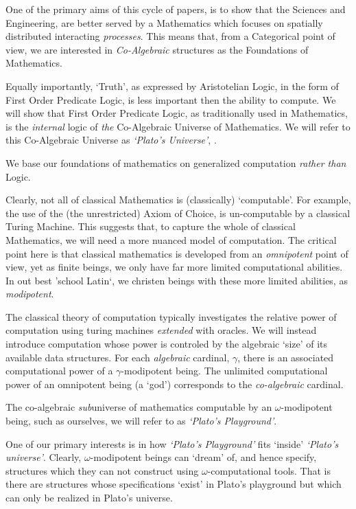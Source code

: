 \documentclass[a4paper,openany]{amsbook}
\begin{document}
One of the primary aims of this cycle of papers, is to show that the Sciences
and Engineering, are better served by a Mathematics which focuses on spatially
distributed interacting \emph{processes}. This means that, from a Categorical
point of view, we are interested in \emph{Co-Algebraic} structures as the
Foundations of Mathematics.

Equally importantly, `Truth', as expressed by Aristotelian Logic, in the form of
First Order Predicate Logic, is less important then the ability to compute. We
will show that First Order Predicate Logic, as traditionally used in
Mathematics, is the \emph{internal} logic of \emph{the} Co-Algebraic Universe of
Mathematics. We will refer to this Co-Algebraic Universe as \emph{`Plato's
Universe'}, \Universe.

We base our foundations of mathematics on generalized computation \emph{rather
than} Logic.

Clearly, not all of classical Mathematics is (classically) `computable'.  For
example, the use of the (the unrestricted) Axiom of Choice, is un-computable by
a classical Turing Machine. This suggests that, to capture the whole of
classical Mathematics, we will need a more nuanced model of computation. The
critical point here is that classical mathematics is developed from an
\emph{omnipotent} point of view, yet as finite beings, we only have far more
limited computational abilities. In out best 'school Latin`, we christen beings
with these more limited abilities, as \emph{modipotent}.

The classical theory of computation typically investigates the relative power of
computation using turing machines \emph{extended} with oracles. We will instead
introduce computation whose power is controled by the algebraic `size' of its
available data structures. For each \emph{algebraic} cardinal, $\gamma$, there
is an associated computational power of a $\gamma$-modipotent being. The
unlimited computational power of an omnipotent being (a `god') corresponds to
the \emph{co-algebraic} cardinal.

The co-algebraic \emph{sub}universe of mathematics computable by an
$\omega$-modipotent being, such as ourselves, we will refer to as \emph{`Plato's
Playground'}.

One of our primary interests is in how \emph{`Plato's Playground'} fits `inside'
\emph{`Plato's universe'}. Clearly, $\omega$-modipotent beings can `dream' of,
and hence specify, structures which they can not construct using
$\omega$-computational tools. That is there are structures whose specifications
`exist' in Plato's playground but which can only be realized in Plato's
universe.
\end{document}
